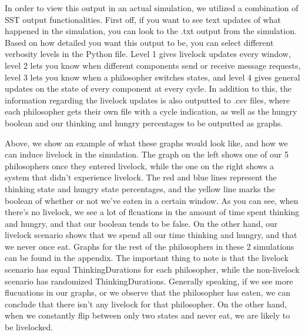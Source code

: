 \documentclass{article}
\begin{document}
In order to view this output in an actual simulation, we utilized a combination of SST output functionalities.  First off, if you want to see text updates of what happened in the simulation, you can look to the .txt output from the simulation.  Based on how detailed you want this output to be, you can select different verbosity levels in the Python file.  Level 1 gives livelock updates every window, level 2 lets you know when different components send or receive message requests, level 3 lets you know when a philosopher switches states, and level 4 gives general updates on the state of every component at every cycle.  In addition to this, the information regarding the livelock updates is also outputted to .csv files, where each philosopher gets their own file with a cycle indication, as well as the hungry boolean and our thinking and hungry percentages to be outputted as graphs. \newline

Above, we show an example of what these graphs would look like, and how we can induce livelock in the simulation.  The graph on the left shows one of our 5 philosophers once they entered livelock, while the one on the right shows a system that didn't experience livelock.  The red and blue lines represent the thinking state and hungry state percentages, and the yellow line marks the boolean of whether or not we've eaten in a certain window.  As you can see, when there's no livelock, we see a lot of flcuations in the amount of time spent thinking and hungry, and that our boolean tends to be false.  On the other hand, our livelock scenario shows that we spend all our time thinking and hungry, and that we never once eat.  Graphs for the rest of the philosophers in these 2 simulations can be found in the appendix.  The important thing to note is that the livelock scenario has equal ThinkingDurations for each philosopher, while the non-livelock scenario has randomized ThinkingDurations.  Generally speaking, if we see more flucuations in our graphs, or we observe that the philosopher has eaten, we can conclude that there isn't any livelock for that philosopher.  On the other hand, when we constantly flip between only two states and never eat, we are likely to be livelocked.
\end{document}
